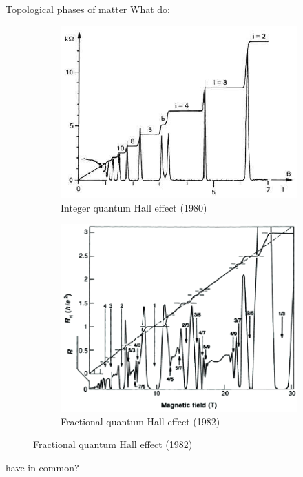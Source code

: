 \documentclass{beamer}
\begin{document}
\setcounter{framenumber}{0}
\begin{frame}{Topological phases of matter}
	What do:
	\begin{figure}
		\centering
		\begin{subfigure}[b]{0.4\textwidth}
			\centering
			\includegraphics[width=\textwidth]{Figures/IntegerQHE.png}
			\caption{Integer quantum Hall effect (1980)}
		\end{subfigure}
		\hfill
		\begin{subfigure}[b]{0.4\textwidth}
			\centering
			\includegraphics[width=\textwidth]{Figures/FractionalQHE.png}
			\caption{Fractional quantum Hall effect (1982)}
		\end{subfigure}
	\end{figure}
	have in common?
\end{frame}
\end{document}
